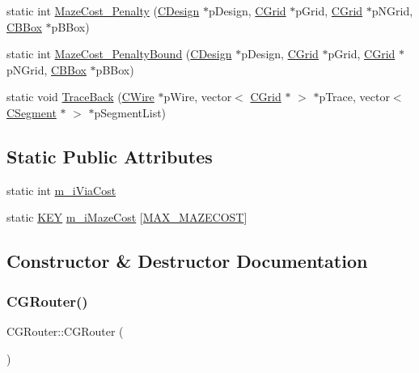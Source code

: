 \begin{DoxyCompactItemize}
\item 
static int \mbox{\hyperlink{classCGRouter_a2ba5fe73784853f2e71d2b3a04a163ec}{Maze\+Cost\+\_\+\+Penalty}} (\mbox{\hyperlink{classCDesign}{C\+Design}} $\ast$p\+Design, \mbox{\hyperlink{classCGrid}{C\+Grid}} $\ast$p\+Grid, \mbox{\hyperlink{classCGrid}{C\+Grid}} $\ast$p\+N\+Grid, \mbox{\hyperlink{classCBBox}{C\+B\+Box}} $\ast$p\+B\+Box)
\item 
static int \mbox{\hyperlink{classCGRouter_a28532892b517c1142198ac3d8fb07583}{Maze\+Cost\+\_\+\+Penalty\+Bound}} (\mbox{\hyperlink{classCDesign}{C\+Design}} $\ast$p\+Design, \mbox{\hyperlink{classCGrid}{C\+Grid}} $\ast$p\+Grid, \mbox{\hyperlink{classCGrid}{C\+Grid}} $\ast$p\+N\+Grid, \mbox{\hyperlink{classCBBox}{C\+B\+Box}} $\ast$p\+B\+Box)
\item 
static void \mbox{\hyperlink{classCGRouter_a7e4f43c1a3a3ef2727c69e360f5998bf}{Trace\+Back}} (\mbox{\hyperlink{classCWire}{C\+Wire}} $\ast$p\+Wire, vector$<$ \mbox{\hyperlink{classCGrid}{C\+Grid}} $\ast$ $>$ $\ast$p\+Trace, vector$<$ \mbox{\hyperlink{classCSegment}{C\+Segment}} $\ast$ $>$ $\ast$p\+Segment\+List)
\end{DoxyCompactItemize}
\subsection*{Static Public Attributes}
\begin{DoxyCompactItemize}
\item 
static int \mbox{\hyperlink{classCGRouter_a12b269c0de33d520a32e95a731b0d927}{m\+\_\+i\+Via\+Cost}}
\item 
static \mbox{\hyperlink{res2dmp_8cpp_a8ae9d53f33f46cfcfcb9736e6351452a}{K\+EY}} \mbox{\hyperlink{classCGRouter_a86119517e05eaa998f13b7f7bd94c5cf}{m\+\_\+i\+Maze\+Cost}} \mbox{[}\mbox{\hyperlink{GRouter_8h_a11cc413a588fe42da3ade0e0043807fb}{M\+A\+X\+\_\+\+M\+A\+Z\+E\+C\+O\+ST}}\mbox{]}
\end{DoxyCompactItemize}


\subsection{Constructor \& Destructor Documentation}
\mbox{\label{classCGRouter_a79a96199aa636d536a95118d05721b35}} 
\subsubsection{\texorpdfstring{CGRouter()}{CGRouter()}}
{\footnotesize\ttfamily C\+G\+Router\+::\+C\+G\+Router (\begin{DoxyParamCaption}{ }\end{DoxyParamCaption})}

